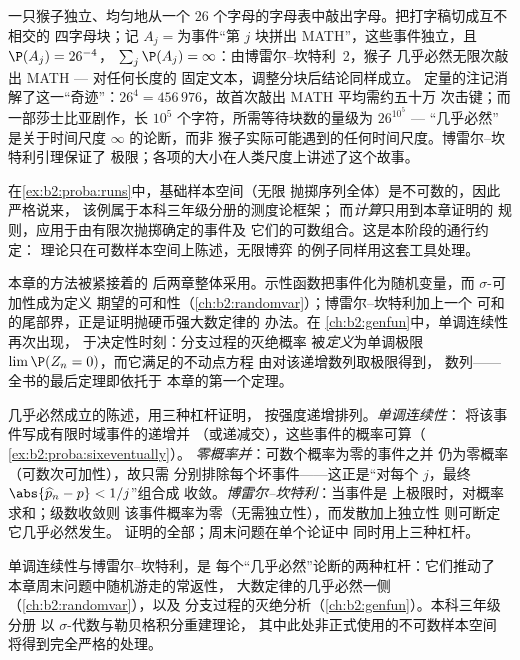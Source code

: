 \begin{example}
一只猴子独立、均匀地从一个
$26$ 个字母的字母表中敲出字母。把打字稿切成互不相交的
四字母块；记 $A_j = {}$为事件“第 $j$ 块拼出
MATH”，这些事件独立，且 $\P(A_j) = 26^{-4}$，
$\sum_j\P(A_j) = \infty$：由博雷尔--坎特利~2，猴子
几乎必然无限次敲出 MATH --- 对任何长度的
固定文本，调整分块后结论同样成立。
定量的注记消解了这一“奇迹”：$26^4 =
456\,976$，故首次敲出 MATH 平均需约五十万
次击键；而一部莎士比亚剧作，长 $10^5$
个字符，所需等待块数的量级为 $26^{10^5}$ --- “几乎必然”
是关于时间尺度 $\infty$ 的论断，而非
猴子实际可能遇到的任何时间尺度。博雷尔--坎特利引理保证了
极限；各项的大小在人类尺度上讲述了这个故事。
\end{example}

\begin{remark}
在\cref{ex:b2:proba:runs}中，基础样本空间（无限
抛掷序列全体）是不可数的，因此严格说来，
该例属于本科三年级分册的测度论框架；
而\emph{计算}只用到本章证明的
规则，应用于由有限次抛掷确定的事件及
它们的可数组合。这是本阶段的通行约定：
理论只在可数样本空间上陈述，无限博弈
的例子同样用这套工具处理。
\end{remark}

\begin{remark}[本分册内的展望]
本章的方法被紧接着的
后两章整体采用。示性函数把事件化为随机变量，而
$\sigma$-可加性成为定义
期望的可和性（\cref{ch:b2:randomvar}）；博雷尔--坎特利加上一个
可和的尾部界，正是证明抛硬币强大数定律的
办法。在
\cref{ch:b2:genfun}中，单调连续性再次出现，
于决定性时刻：分支过程的灭绝概率
被\emph{定义}为单调极限
$\lim\P(Z_n = 0)$，而它满足的不动点方程
由对该递增数列取极限得到，
数列——全书的最后定理即依托于
本章的第一个定理。
\end{remark}

\begin{remark}[方法：证明概率为一的三种途径]
几乎必然成立的陈述，用三种杠杆证明，
按强度递增排列。\emph{单调连续性}：
将该事件写成有限时域事件的递增并
（或递减交），这些事件的概率可算（
\cref{ex:b2:proba:sixeventually}）。
\emph{零概率并}：可数个概率为零的事件之并
仍为零概率（可数次可加性），故只需
分别排除每个坏事件——这正是“对每个
$j$，最终 $\abs{\widehat p_n - p} < 1/j$”组合成
收敛。\emph{博雷尔--坎特利}：当事件是
上极限时，对概率求和；级数收敛则
该事件概率为零（无需独立性），而发散加上独立性
则可断定它几乎必然发生。
证明的全部；周末问题在单个论证中
同时用上三种杠杆。
\end{remark}

\begin{remark}[应用之处]
单调连续性与博雷尔--坎特利，是
每个“几乎必然”论断的两种杠杆：它们推动了
本章周末问题中随机游走的常返性，
大数定律的几乎必然一侧
（\cref{ch:b2:randomvar}），以及
分支过程的灭绝分析（\cref{ch:b2:genfun}）。本科三年级分册
以 $\sigma$-代数与勒贝格积分重建理论，
其中此处非正式使用的不可数样本空间
将得到完全严格的处理。
\end{remark}

